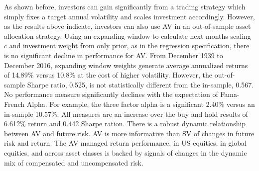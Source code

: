 As shown before, investors can gain significantly from a trading strategy which simply fixes a target annual volatility and scales investment accordingly. However, as the results above indicate, investors can also use AV in an out-of-sample asset allocation strategy. Using an expanding window to calculate next months scaling $c$ and investment weight from only prior, as in the regression specification, there is no significant decline in performance for AV. From December 1939 to December 2016, expanding window weights generate average annualized returns of 14.89\% versus 10.8\% at the cost of higher volatility. However, the out-of-sample Sharpe ratio, 0.525, is not statistically different from the in-sample, 0.567. No performance measure significantly declines with the expectation of Fama-French Alpha. For example, the three factor alpha is a significant 2.40\% versus an in-sample 10.57\%. All measures are an increase over the buy and hold results of 6.612\% return and 0.442 Sharpe ration. %
There is a robust dynamic relationship between AV and future risk. AV is more informative than SV of changes in future risk and return. The AV managed return performance, in US equities, in global equities, and across asset classes is backed by signals of changes in the dynamic mix of compensated and uncompensated risk.